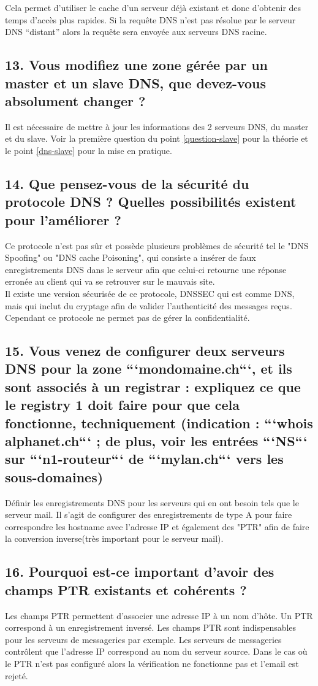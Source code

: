 \documentclass{article}
\begin{document}
Cela permet d'utiliser le cache d'un serveur déjà existant et donc d'obtenir des temps d'accès plus rapides. Si la requête DNS n'est pas résolue par le serveur DNS “distant” alors la requête sera envoyée aux serveurs DNS racine.

\subsection*{13. Vous modifiez une zone gérée par un master et un slave DNS, que devez-vous absolument changer ?}
Il est nécessaire de mettre à jour les informations des 2 serveurs DNS, du master et du slave. Voir la première question du point \ref{question-slave} pour la théorie et le point \ref{dns-slave} pour la mise en pratique.

\subsection*{14. Que pensez-vous de la sécurité du protocole DNS ? Quelles possibilités existent pour l’améliorer ?}
Ce protocole n'est pas sûr et possède plusieurs problèmes de sécurité tel le "DNS Spoofing" ou "DNS cache Poisoning", qui consiste a insérer de faux enregistrements DNS dans le serveur afin que celui-ci retourne une réponse erronée au client qui va se retrouver sur le mauvais site.\cite{attaques}\\

Il existe une version sécurisée de ce protocole, DNSSEC qui est comme DNS, mais qui inclut du cryptage afin de valider l'authenticité des messages reçus. Cependant ce protocole ne permet pas de gérer la confidentialité.\cite{DNSSEC}

\subsection*{15. Vous venez de configurer deux serveurs DNS pour la zone ```mondomaine.ch```, et ils sont associés à un registrar : expliquez ce que le registry 1 doit faire pour que cela fonctionne, techniquement (indication : ```whois alphanet.ch``` ; de plus, voir les entrées ```NS``` sur ```n1-routeur``` de ```mylan.ch``` vers les sous-domaines)}
Définir les enregistrements DNS pour les serveurs qui en ont besoin tels que le serveur mail. Il s'agit de configurer des enregistrements de type A pour faire correspondre les hostname avec l'adresse IP et également des "PTR" afin de faire la conversion inverse(très important pour le serveur mail).

\subsection*{16. Pourquoi est-ce important d’avoir des champs PTR existants et cohérents ?}
Les champs PTR permettent d'associer une adresse IP à un nom d'hôte. Un PTR correspond à un enregistrement inversé. Les champs PTR sont indispensables pour les serveurs de messageries par exemple.
Les serveurs de messageries contrôlent que l'adresse IP correspond au nom du serveur source. Dans le cas où le PTR n'est pas configuré alors la vérification ne fonctionne pas et l'email est rejeté.
\end{document}
